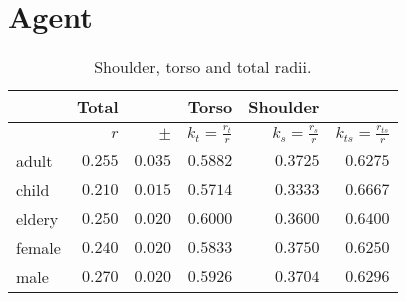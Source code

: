 \section{Agent}

\begin{table}[H]
\begin{tabularx}{1.0\linewidth}{ l r r r r r}
& Total && Torso & Shoulder & \\
\hline
& $ r $ & $ \pm $ & $ k_{t} = \frac{r_{t}}{r} $ & $ k_{s} = \frac{r_{s}}{r} $ & $ k_{ts} = \frac{r_{ts}}{r} $ \\
\hline\hline
adult & $ 0.255 $ & $ 0.035 $ & $ 0.5882 $ & $ 0.3725 $ & $ 0.6275 $ \\
child & $ 0.210 $ & $ 0.015 $ & $ 0.5714 $ & $ 0.3333 $ & $ 0.6667 $ \\
eldery & $ 0.250 $ & $ 0.020 $ & $ 0.6000 $ & $ 0.3600 $ & $ 0.6400 $ \\
female & $ 0.240 $ & $ 0.020 $ & $ 0.5833 $ & $ 0.3750 $ & $ 0.6250 $ \\
male & $ 0.270 $ & $ 0.020 $ & $ 0.5926 $ & $ 0.3704 $ & $ 0.6296 $ \\
\hline
\end{tabularx} 
\caption{Shoulder, torso and total radii.}
\end{table}



